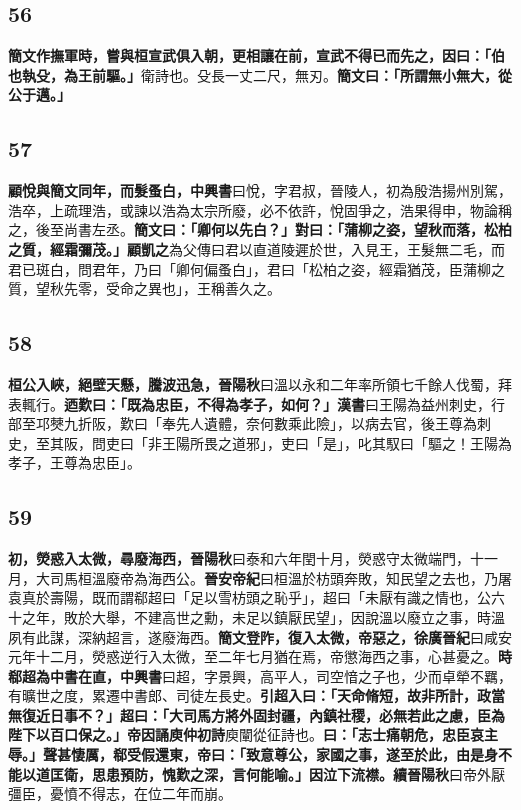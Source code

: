 \subsection*{56}

\textbf{簡文作撫軍時，嘗與桓宣武俱入朝，更相讓在前，宣武不得已而先之，因曰：「伯也執殳，為王前驅。」}{\footnotesize 衛詩也。殳長一丈二尺，無刃。}\textbf{簡文曰：「所謂無小無大，從公于邁。」}

\subsection*{57}

\textbf{顧悅與簡文同年，而髮蚤白，}{\footnotesize \textbf{中興書}曰悅，字君叔，晉陵人，初為殷浩揚州別駕，浩卒，上疏理浩，或諫以浩為太宗所廢，必不依許，悅固爭之，浩果得申，物論稱之，後至尚書左丞。}\textbf{簡文曰：「卿何以先白？」對曰：「蒲柳之姿，望秋而落，松柏之質，經霜彌茂。」}{\footnotesize \textbf{顧凱之}為父傳曰君以直道陵遲於世，入見王，王髮無二毛，而君已斑白，問君年，乃曰「卿何偏蚤白」，君曰「松柏之姿，經霜猶茂，臣蒲柳之質，望秋先零，受命之異也」，王稱善久之。}

\subsection*{58}

\textbf{桓公入峽，絕壁天懸，騰波迅急，}{\footnotesize \textbf{晉陽秋}曰溫以永和二年率所領七千餘人伐蜀，拜表輒行。}\textbf{迺歎曰：「既為忠臣，不得為孝子，如何？」}{\footnotesize \textbf{漢書}曰王陽為益州刺史，行部至邛僰九折阪，歎曰「奉先人遺體，奈何數乘此險」，以病去官，後王尊為刺史，至其阪，問吏曰「非王陽所畏之道邪」，吏曰「是」，叱其馭曰「驅之！王陽為孝子，王尊為忠臣」。}

\subsection*{59}

\textbf{初，熒惑入太微，尋廢海西，}{\footnotesize \textbf{晉陽秋}曰泰和六年閏十月，熒惑守太微端門，十一月，大司馬桓溫廢帝為海西公。\textbf{晉安帝紀}曰桓溫於枋頭奔敗，知民望之去也，乃屠袁真於壽陽，既而謂郗超曰「足以雪枋頭之恥乎」，超曰「未厭有識之情也，公六十之年，敗於大舉，不建高世之勳，未足以鎮厭民望」，因說溫以廢立之事，時溫夙有此謀，深納超言，遂廢海西。}\textbf{簡文登阼，復入太微，帝惡之，}{\footnotesize \textbf{徐廣晉紀}曰咸安元年十二月，熒惑逆行入太微，至二年七月猶在焉，帝懲海西之事，心甚憂之。}\textbf{時郗超為中書在直，}{\footnotesize \textbf{中興書}曰超，字景興，高平人，司空愔之子也，少而卓犖不羈，有曠世之度，累遷中書郎、司徒左長史。}\textbf{引超入曰：「天命脩短，故非所計，政當無復近日事不？」超曰：「大司馬方將外固封疆，內鎮社稷，必無若此之慮，臣為陛下以百口保之。」帝因誦庾仲初詩}{\footnotesize 庾闡從征詩也。}\textbf{曰：「志士痛朝危，忠臣哀主辱。」聲甚悽厲，郗受假還東，帝曰：「致意尊公，家國之事，遂至於此，由是身不能以道匡衛，思患預防，愧歎之深，言何能喻。」因泣下流襟。}{\footnotesize \textbf{續晉陽秋}曰帝外厭彊臣，憂憤不得志，在位二年而崩。}

